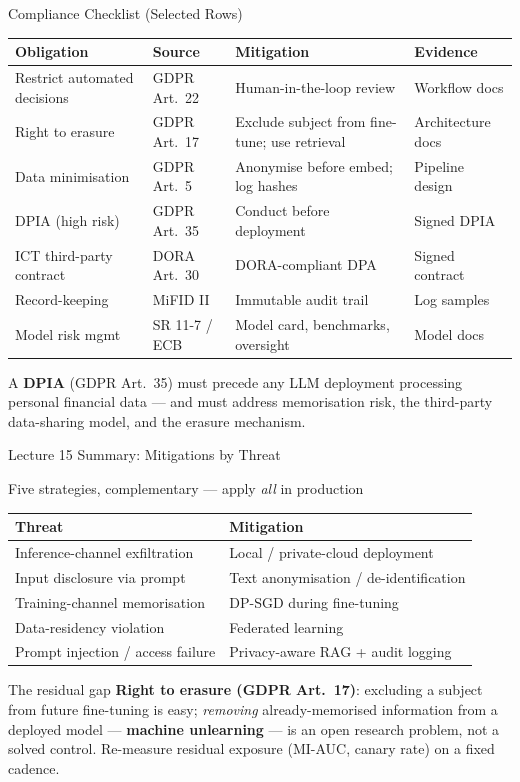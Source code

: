 \documentclass[9pt,t]{beamer}
\begin{document}
\begin{frame}{Compliance Checklist (Selected Rows)}
\footnotesize
\begin{tabular}{p{2.7cm}p{1.9cm}p{2.7cm}p{2.6cm}}
\toprule
\textbf{Obligation} & \textbf{Source} & \textbf{Mitigation} & \textbf{Evidence} \\
\midrule
Restrict automated decisions & GDPR Art.\ 22 & Human-in-the-loop review & Workflow docs \\
Right to erasure & GDPR Art.\ 17 & Exclude subject from fine-tune; use retrieval & Architecture docs \\
Data minimisation & GDPR Art.\ 5 & Anonymise before embed; log hashes & Pipeline design \\
DPIA (high risk) & GDPR Art.\ 35 & Conduct before deployment & Signed DPIA \\
ICT third-party contract & DORA Art.\ 30 & DORA-compliant DPA & Signed contract \\
Record-keeping & MiFID II & Immutable audit trail & Log samples \\
Model risk mgmt & SR 11-7 / ECB & Model card, benchmarks, oversight & Model docs \\
\bottomrule
\end{tabular}

\smallskip
A \textbf{DPIA} (GDPR Art.\ 35) must precede any LLM deployment processing personal
financial data --- and must address memorisation risk, the third-party data-sharing
model, and the erasure mechanism.
\end{frame}

\begin{frame}{Lecture 15 Summary: Mitigations by Threat}
\begin{block}{Five strategies, complementary --- apply \emph{all} in production}
\small
\begin{tabular}{p{5.0cm}p{5.0cm}}
\toprule
\textbf{Threat} & \textbf{Mitigation} \\
\midrule
Inference-channel exfiltration & Local / private-cloud deployment \\
Input disclosure via prompt & Text anonymisation / de-identification \\
Training-channel memorisation & DP-SGD during fine-tuning \\
Data-residency violation & Federated learning \\
Prompt injection / access failure & Privacy-aware RAG + audit logging \\
\bottomrule
\end{tabular}
\end{block}

\medskip
\normalsize
\begin{alertblock}{The residual gap}
\textbf{Right to erasure (GDPR Art.\ 17)}: excluding a subject from future
fine-tuning is easy; \emph{removing} already-memorised information from a deployed
model --- \textbf{machine unlearning} --- is an open research problem, not a solved
control. Re-measure residual exposure (MI-AUC, canary rate) on a fixed cadence.
\end{alertblock}
\end{frame}
\end{document}
